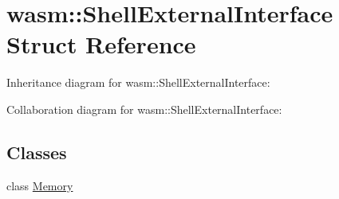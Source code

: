 \hypertarget{structwasm_1_1_shell_external_interface}{}\section{wasm\+:\+:Shell\+External\+Interface Struct Reference}
\label{structwasm_1_1_shell_external_interface}


Inheritance diagram for wasm\+:\+:Shell\+External\+Interface\+:


Collaboration diagram for wasm\+:\+:Shell\+External\+Interface\+:
\subsection*{Classes}
\begin{DoxyCompactItemize}
\item 
class \mbox{\hyperlink{classwasm_1_1_shell_external_interface_1_1_memory}{Memory}}
\end{DoxyCompactItemize}
